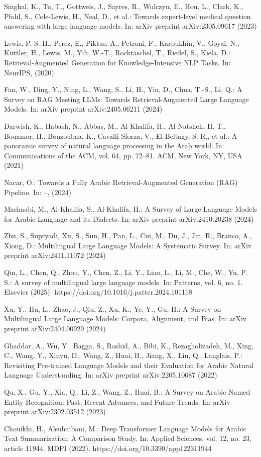 \documentclass[runningheads]{llncs}
\begin{document}
\begin{thebibliography}{8}
Singhal, K., Tu, T., Gottweis, J., Sayres, R., Wulczyn, E., Hou, L., Clark, K., Pfohl, S., Cole-Lewis, H., Neal, D., et al.: Towards expert-level medical question answering with large language models. In: arXiv preprint arXiv:2305.09617 (2023)


Lewis, P. S. H., Perez, E., Piktus, A., Petroni, F., Karpukhin, V., Goyal, N., Küttler, H., Lewis, M., Yih, W.-T., Rocktäschel, T., Riedel, S., Kiela, D.: Retrieval-Augmented Generation for Knowledge-Intensive NLP Tasks. In: NeurIPS, (2020)

Fan, W., Ding, Y., Ning, L., Wang, S., Li, H., Yin, D., Chua, T.-S., Li, Q.: A Survey on RAG Meeting LLMs: Towards Retrieval-Augmented Large Language Models. In: arXiv preprint arXiv:2405.06211 (2024)


Darwish, K., Habash, N., Abbas, M., Al-Khalifa, H., Al-Natsheh, H. T., Bouamor, H., Bouzoubaa, K., Cavalli-Sforza, V., El-Beltagy, S. R., et al.: A panoramic survey of natural language processing in the Arab world. In: Communications of the ACM, vol. 64, pp. 72--81. ACM, New York, NY, USA (2021)

Nacar, O.: Towards a Fully Arabic Retrieval-Augmented Generation (RAG) Pipeline. In: --, (2024)


Mashaabi, M., Al-Khalifa, S., Al-Khalifa, H.: A Survey of Large Language Models for Arabic Language and its Dialects. In: arXiv preprint arXiv:2410.20238 (2024)

Zhu, S., Supryadi, Xu, S., Sun, H., Pan, L., Cui, M., Du, J., Jin, R., Branco, A., Xiong, D.: Multilingual Large Language Models: A Systematic Survey. In: arXiv preprint arXiv:2411.11072 (2024)

Qin, L., Chen, Q., Zhou, Y., Chen, Z., Li, Y., Liao, L., Li, M., Che, W., Yu, P. S.: A survey of multilingual large language models. In: Patterns, vol. 6, no. 1. Elsevier (2025). https://doi.org/10.1016/j.patter.2024.101118
 
Xu, Y., Hu, L., Zhao, J., Qiu, Z., Xu, K., Ye, Y., Gu, H.: A Survey on Multilingual Large Language Models: Corpora, Alignment, and Bias. In: arXiv preprint arXiv:2404.00929 (2024)

Ghaddar, A., Wu, Y., Bagga, S., Rashid, A., Bibi, K., Rezagholizadeh, M., Xing, C., Wang, Y., Xinyu, D., Wang, Z., Huai, B., Jiang, X., Liu, Q., Langlais, P.: Revisiting Pre-trained Language Models and their Evaluation for Arabic Natural Language Understanding. In: arXiv preprint arXiv:2205.10687 (2022)

Qu, X., Gu, Y., Xia, Q., Li, Z., Wang, Z., Huai, B.: A Survey on Arabic Named Entity Recognition: Past, Recent Advances, and Future Trends. In: arXiv preprint arXiv:2302.03512 (2023)

Chouikhi, H., Alsuhaibani, M.: Deep Transformer Language Models for Arabic Text Summarization: A Comparison Study. In: Applied Sciences, vol. 12, no. 23, article 11944. MDPI (2022). https://doi.org/10.3390/app122311944


\end{thebibliography}
\end{document}

